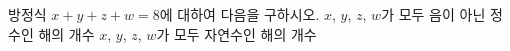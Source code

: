 방정식 $x+y+z+w=8$에 대하여 다음을 구하시오.
 $x$, $y$, $z$, $w$가 모두 음이 아닌 정수인 해의 개수
 $x$, $y$, $z$, $w$가 모두 자연수인 해의 개수
